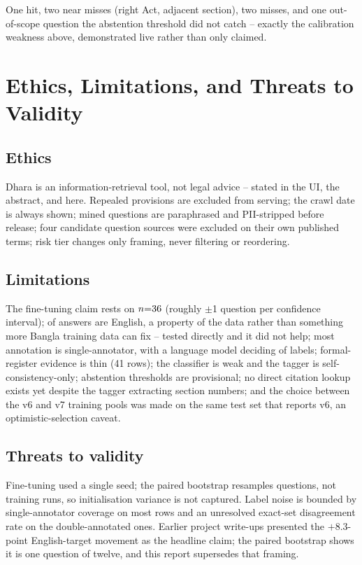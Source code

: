\documentclass[10pt,a4paper]{article}
\begin{document}
\begin{table}[H]
\centering

\caption{Six illustrative queries written for this report (not gold; no ground truth), captured live from the running service.}
\end{table}

One hit, two near misses (right Act, adjacent section), two misses, and one out-of-scope question the abstention threshold did not catch -- exactly the calibration weakness above, demonstrated live rather than only claimed.

\section{Ethics, Limitations, and Threats to Validity}

\subsection{Ethics}
Dhara is an information-retrieval tool, not legal advice -- stated in the UI, the abstract, and here. Repealed provisions are excluded from serving; the crawl date is always shown; mined questions are paraphrased and PII-stripped before release; four candidate question sources were excluded on their own published terms; risk tier changes only framing, never filtering or reordering.

\subsection{Limitations}
The fine-tuning claim rests on $n{=}36$ (roughly $\pm$1 question per confidence interval); \pctProbeEn{} of answers are English, a property of the data rather than something more Bangla training data can fix -- tested directly and it did not help; most annotation is single-annotator, with a language model deciding \nLlmLabelled{} of \nGold{} labels; formal-register evidence is thin (41 rows); the classifier is weak and the tagger is self-consistency-only; abstention thresholds are provisional; no direct citation lookup exists yet despite the tagger extracting section numbers; and the choice between the v6 and v7 training pools was made on the same test set that reports v6, an optimistic-selection caveat.

\subsection{Threats to validity}
Fine-tuning used a single seed; the paired bootstrap resamples questions, not training runs, so initialisation variance is not captured. Label noise is bounded by single-annotator coverage on most rows and an unresolved exact-set disagreement rate on the double-annotated ones. Earlier project write-ups presented the $+8.3$-point English-target movement as the headline claim; the paired bootstrap shows it is one question of twelve, and this report supersedes that framing.
\end{document}
